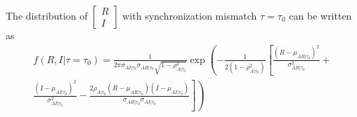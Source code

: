 The distribution of 
$\begin{bmatrix}
  R \\
  I
\end{bmatrix}$ with synchronization mismatch $\tau = \tau_0$ can be written as
\begin{multline}
  f(R,I | \tau=\tau_0) = \frac{1}{2\pi\sigma_{AI|\tau_0}\sigma_{AR|\tau_0}\sqrt{1 - \rho_{A|\tau_0}^2}}\exp\left( -\frac{1}{2(1-\rho_{A|\tau_0}^2)}\left[ \frac{(R-\mu_{AR|\tau_0})^2}{\sigma_{AR|\tau_0}^2} + \right.\right.\\
  \left. \left.  \frac{(I-\mu_{AI|\tau_0})^2}{\sigma_{AI|\tau_0}^2} - \frac{2\rho_{A|\tau_0}(R-\mu_{AR|\tau_0})(I-\mu_{AI|\tau_0})}{\sigma_{AR|\tau_0}\sigma_{AI|\tau_0}}\right] \right)
  \label{disRI}
\end{multline}

